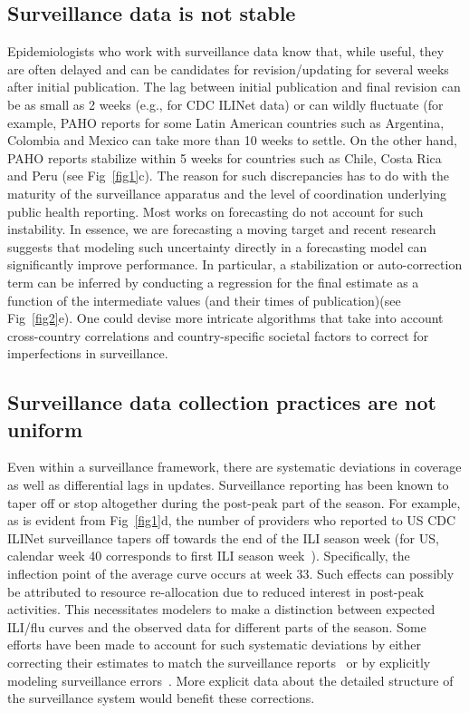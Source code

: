 \documentclass[10pt,letterpaper]{article}
\begin{document}
\subsection*{Surveillance data is not stable}
Epidemiologists who work with surveillance data know that, while useful, they
are often delayed and can be candidates for revision/updating for several weeks
after initial publication. The lag between initial publication and final
revision can be as small as 2 weeks (e.g., for CDC ILINet data) or can wildly
fluctuate (for example, PAHO reports for some Latin American countries such as
Argentina, Colombia and Mexico can take more than 10 weeks to settle. On the
other hand, PAHO reports stabilize within 5 weeks for countries such as Chile,
Costa Rica and Peru (see Fig~\ref{fig1}c).  The reason for such discrepancies
has to do with the maturity of the surveillance apparatus and the level of
coordination underlying public health reporting. Most works on forecasting do
not account for such instability. In essence, we are forecasting a moving
target and recent research~\cite{fischhoff2014communicating} suggests that
modeling such uncertainty directly in a forecasting model can significantly
improve performance. In particular, a stabilization or auto-correction term can
be inferred by conducting a regression for the final estimate as a function of
the intermediate values (and their times of publication)(see Fig~\ref{fig2}e).
One could devise more intricate algorithms that take into account cross-country
correlations and country-specific societal factors to correct for imperfections
in surveillance. 

\subsection*{Surveillance data collection practices are not uniform}
Even within a surveillance framework, there are systematic deviations in
coverage as well as differential lags in updates. Surveillance reporting has
been known to taper off or stop altogether during the post-peak part of the
season. For example, as is evident from Fig~\ref{fig1}d, the number of
providers who reported to US CDC ILINet surveillance tapers off towards the end
of the ILI season week (for US, calendar week 40 corresponds to first ILI
season week~\cite{cdc}).  Specifically, the inflection point of the average
curve occurs at week 33. Such effects can possibly be attributed to resource
re-allocation due to reduced interest in post-peak activities. This
necessitates modelers to make a distinction between expected ILI/flu curves and
the observed data for different parts of the season. Some efforts have been
made to account for such systematic deviations by either correcting their
estimates to match the surveillance reports~\cite{chakraborty2014forecasting}
or by explicitly modeling surveillance errors~\cite{shaman2013real}.  More
explicit data about the detailed structure of the surveillance system would
benefit these corrections.
\end{document}

